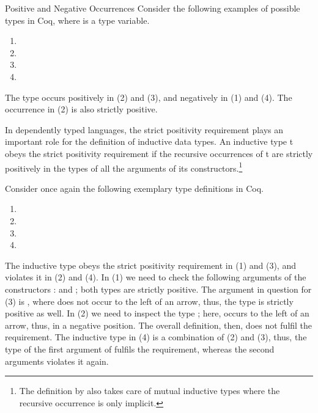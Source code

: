 \begin{excursus}{Positive and Negative Occurrences}
Consider the following examples of possible types in Coq, where
 is a type variable.

\begin{enumerate}
\item[(1)] 
\item[(2)] 
\item[(3)] 
\item[(4)] 
\end{enumerate}

The type  occurs positively in (2) and (3), and negatively in
(1) and (4).
The occurrence in (2) is also strictly positive.

In dependently typed languages, the strict positivity
requirement plays an important role for the definition of inductive
data types.
An inductive type t obeys the strict positivity requirement if the
recursive occurrences of t are strictly positively in the types of all
the arguments of its constructors.\footnote{The definition by
  \citeauthor{blanqui2002inductivedatatype} also takes care of mutual
  inductive types where the recursive occurrence is only implicit.}

Consider once again the following exemplary type definitions in Coq.

\begin{enumerate}
\item[(1)] 
\item[(2)] 
\item[(3)] 
\item[(4)] 
\end{enumerate}

The inductive type  obeys the strict positivity requirement in
(1) and (3), and violates it in (2) and (4).
In (1) we need to check the following arguments of the constructors
:  and ; both types are strictly positive.
The argument in question for (3) is , where 
does not occur to the left of an arrow, thus, the type is strictly
positive as well.
In (2) we need to inspect the type ; here, 
occurs to the left of an arrow, thus, in a negative position.
The overall definition, then, does not fulfil the requirement.
The inductive type in (4) is a combination of (2) and (3), thus, the
type of the first argument of  fulfils the requirement,
whereas the second arguments violates it again.
\end{excursus}

